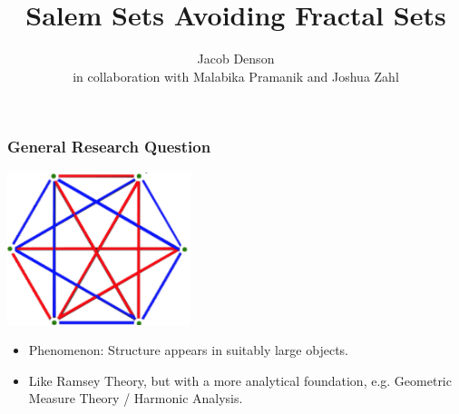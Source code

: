\documentclass[usenames,dvipsnames]{beamer}
\title{Salem Sets Avoiding Fractal Sets}
\author{Jacob Denson\\ \footnotesize in collaboration with Malabika Pramanik and Joshua Zahl}
\institute{University of British Columbia}
\begin{document}
\maketitle




\begin{frame}
    \frametitle{General Research Question}

    \begin{center}
    \includegraphics[width=0.4\textwidth]{../Images/RamseyTheory}
    \end{center}

    \begin{itemize}
        \item Phenomenon: Structure appears in suitably large objects.

        \item Like Ramsey Theory, but with a more analytical foundation, e.g. Geometric Measure Theory / Harmonic Analysis.
    \end{itemize}
\end{frame}
\end{document}
